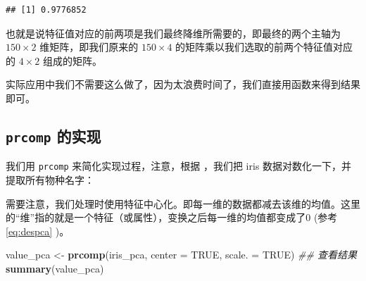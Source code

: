 \documentclass[
]{krantz}
\makeatletter
\newenvironment{Shaded}{\begin{snugshade}}{\end{snugshade}}
\newcommand{\CommentTok}[1]{\textcolor[rgb]{0.56,0.35,0.01}{\textit{#1}}}
\newcommand{\DataTypeTok}[1]{\textcolor[rgb]{0.13,0.29,0.53}{#1}}
\newcommand{\DecValTok}[1]{\textcolor[rgb]{0.00,0.00,0.81}{#1}}
\newcommand{\KeywordTok}[1]{\textcolor[rgb]{0.13,0.29,0.53}{\textbf{#1}}}
\newcommand{\NormalTok}[1]{#1}
\newcommand{\OperatorTok}[1]{\textcolor[rgb]{0.81,0.36,0.00}{\textbf{#1}}}
\newcommand{\OtherTok}[1]{\textcolor[rgb]{0.56,0.35,0.01}{#1}}
\newcommand{\StringTok}[1]{\textcolor[rgb]{0.31,0.60,0.02}{#1}}
\newenvironment{kframe}{%
\medskip{}
\setlength{\fboxsep}{.8em}
 \def\at@end@of@kframe{}%
 \ifinner\ifhmode%
  \def\at@end@of@kframe{\end{minipage}}%
  \begin{minipage}{\columnwidth}%
 \fi\fi%
 \def\FrameCommand##1{\hskip\@totalleftmargin \hskip-\fboxsep
 \colorbox{shadecolor}{##1}\hskip-\fboxsep
     \hskip-\linewidth \hskip-\@totalleftmargin \hskip\columnwidth}%
 \MakeFramed {\advance\hsize-\width
   \@totalleftmargin\z@ \linewidth\hsize
   \@setminipage}}%
 {\par\unskip\endMakeFramed%
 \at@end@of@kframe}
\renewenvironment{Shaded}{\begin{kframe}}{\end{kframe}}
\makeatother
\begin{document}
\begin{Shaded}
\end{Shaded}

\begin{verbatim}
## [1] 0.9776852
\end{verbatim}

也就是说特征值对应的前两项是我们最终降维所需要的，即最终的两个主轴为 \(150 \times 2\) 维矩阵，即我们原来的 \(150 \times 4\) 的矩阵乘以我们选取的前两个特征值对应的 \(4 \times 2\) 组成的矩阵。

实际应用中我们不需要这么做了，因为太浪费时间了，我们直接用函数来得到结果即可。

\hypertarget{prcom}{%
\subsection{\texorpdfstring{\texttt{prcomp} 的实现}{prcomp 的实现}}\label{prcom}}

我们用 \texttt{prcomp} 来简化实现过程，注意，根据 \citet{kemp2003modern}，我们把 iris 数据对数化一下，并提取所有物种名字：

\begin{Shaded}
\end{Shaded}

需要注意，我们处理时使用特征中心化。即每一维的数据都减去该维的均值。这里的``维''指的就是一个特征（或属性），变换之后每一维的均值都变成了0 (参考 \eqref{eq:despca} )。

\begin{Shaded}
\begin{Highlighting}[]
\NormalTok{value\_pca \textless{}{-}}\StringTok{ }\KeywordTok{prcomp}\NormalTok{(iris\_pca, }\DataTypeTok{center =} \OtherTok{TRUE}\NormalTok{, }\DataTypeTok{scale. =} \OtherTok{TRUE}\NormalTok{)}
\CommentTok{\#\# 查看结果}
\KeywordTok{summary}\NormalTok{(value\_pca)}
\end{Highlighting}
\end{Shaded}
\end{document}
